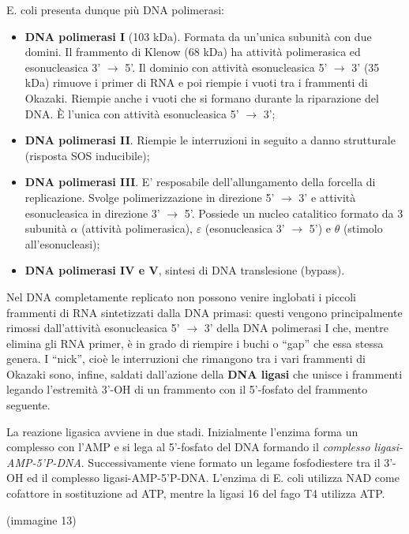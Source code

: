 \documentclass[]{article}
\begin{document}
E. coli presenta dunque più DNA polimerasi:

\begin{itemize}
\itemsep1pt\parskip0pt
\item
  \textbf{DNA polimerasi I} (103 kDa). Formata da un'unica subunità con
  due domini. Il frammento di Klenow (68 kDa) ha attività polimerasica
  ed esonucleasica 3' $\rightarrow$ 5'. Il dominio con attività
  esonucleasica 5' $\rightarrow$ 3' (35 kDa) rimuove i primer di RNA e
  poi riempie i vuoti tra i frammenti di Okazaki. Riempie anche i vuoti
  che si formano durante la riparazione del DNA. È l'unica con attività
  esonucleasica 5' $\rightarrow$ 3';
\item
  \textbf{DNA polimerasi II}. Riempie le interruzioni in seguito a danno
  strutturale (risposta SOS inducibile);
\item
  \textbf{DNA polimerasi III}. E' resposabile dell'allungamento della
  forcella di replicazione. Svolge polimerizzazione in direzione 5'
  $\rightarrow$ 3' e attività esonucleasica in direzione 3'
  $\rightarrow$ 5'. Possiede un nucleo catalitico formato da 3 subunità
  $\alpha$ (attività polimerasica), $\varepsilon$ (esonucleasica 3'
  $\rightarrow$ 5') e $\theta$ (stimolo all'esonucleasi);
\item
  \textbf{DNA polimerasi IV e V}, sintesi di DNA translesione (bypass).
\end{itemize}

Nel DNA completamente replicato non possono venire inglobati i piccoli
frammenti di RNA sintetizzati dalla DNA primasi: questi vengono
principalmente rimossi dall'attività esonucleasica 5' $\rightarrow$ 3'
della DNA polimerasi I che, mentre elimina gli RNA primer, è in grado di
riempire i buchi o ``gap'' che essa stessa genera. I ``nick'', cioè le
interruzioni che rimangono tra i vari frammenti di Okazaki sono, infine,
saldati dall'azione della \textbf{DNA ligasi} che unisce i frammenti
legando l'estremità 3'-OH di un frammento con il 5'-fosfato del
frammento seguente.

La reazione ligasica avviene in due stadi. Inizialmente l'enzima forma
un complesso con l'AMP e si lega al 5'-fosfato del DNA formando il
\emph{complesso ligasi-AMP-5'P-DNA}. Successivamente viene formato un
legame fosfodiestere tra il 3'-OH ed il complesso ligasi-AMP-5'P-DNA.
L'enzima di E. coli utilizza NAD come cofattore in sostituzione ad ATP,
mentre la ligasi 16 del fago T4 utilizza ATP.

(immagine 13)
\end{document}
